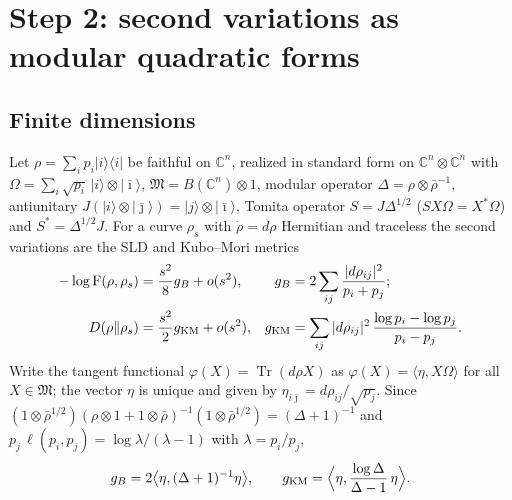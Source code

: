 \documentclass[11pt]{article}
\theoremstyle{accent}
\theoremstyle{definition}
\newcommand{\cM}{\mathfrak{M}}
\newcommand{\Tr}{\operatorname{Tr}}
\newcommand{\Fid}{\operatorname{F}}
\begin{document}
\section{Step 2: second variations as modular quadratic forms}\label{sec:step2}

\subsection{Finite dimensions}
Let \(\rho=\sum_ip_i|i\rangle\langle i|\) be faithful on \(\mathbb C^n\), realized in standard form on \(\mathbb C^n\otimes\overline{\mathbb C^n}\) with \(\Omega=\sum_i\sqrt{p_i}\,|i\rangle\otimes|\bar\imath\rangle\), \(\cM=B(\mathbb C^n)\otimes1\), modular operator \(\Delta=\rho\otimes\bar\rho^{-1}\), antiunitary \(J(|i\rangle\otimes|\bar\jmath\rangle)=|j\rangle\otimes|\bar\imath\rangle\), Tomita operator \(S=J\Delta^{1/2}\) (\(SX\Omega=X^*\Omega\)) and \(S^*=\Delta^{1/2}J\).  For a curve \(\rho_s\) with \(\dot\rho=d\rho\) Hermitian and traceless the second variations are the SLD and Kubo--Mori metrics
\begin{align}
 -\log\Fid(\rho,\rho_s)&=\frac{s^2}{8}g_B+o(s^2),& g_B&=2\sum_{ij}\frac{|d\rho_{ij}|^2}{p_i+p_j};\label{eq:metrics-fd}\\
 D(\rho\Vert\rho_s)&=\frac{s^2}{2}g_{\mathrm{KM}}+o(s^2),& g_{\mathrm{KM}}&=\sum_{ij}|d\rho_{ij}|^2\,\frac{\log p_i-\log p_j}{p_i-p_j}.\notag
\end{align}
Write the tangent functional \(\varphi(X)=\Tr(d\rho X)\) as \(\varphi(X)=\langle\eta,X\Omega\rangle\) for all \(X\in\cM\); the vector \(\eta\) is unique and given by \(\eta_{i\bar\jmath}=d\rho_{ij}/\sqrt{p_j}\).  Since \((1\otimes\bar\rho^{1/2})(\rho\otimes1+1\otimes\bar\rho)^{-1}(1\otimes\bar\rho^{1/2})=(\Delta+1)^{-1}\) and \(p_j\,\ell(p_i,p_j)=\log\lambda/(\lambda-1)\) with \(\lambda=p_i/p_j\),
\begin{equation}\label{eq:metrics-eta}
 g_B=2\bigl\langle\eta,(\Delta+1)^{-1}\eta\bigr\rangle,\qquad g_{\mathrm{KM}}=\Bigl\langle\eta,\frac{\log\Delta}{\Delta-1}\,\eta\Bigr\rangle.
\end{equation}
\end{document}
